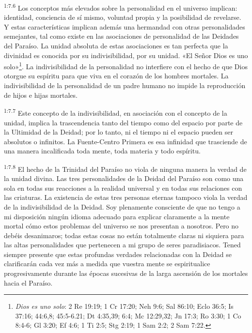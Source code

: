 \par
\textsuperscript{1:7.6} Los conceptos más elevados sobre la personalidad en el universo implican: identidad, conciencia de sí mismo, voluntad propia y la posibilidad de revelarse. Y estas características implican además una hermandad con otras personalidades semejantes, tal como existe en las asociaciones de personalidad de las Deidades del Paraíso. La unidad absoluta de estas asociaciones es tan perfecta que la divinidad es conocida por su indivisibilidad, por su unidad. «El Señor Dios es uno solo»\footnote{\textit{Dios es uno solo}: 2 Re 19:19; 1 Cr 17:20; Neh 9:6; Sal 86:10; Eclo 36:5; Is 37:16; 44:6,8; 45:5-6.21; Dt 4:35,39; 6:4; Mc 12:29,32; Jn 17:3; Ro 3:30; 1 Co 8:4-6; Gl 3:20; Ef 4:6; 1 Ti 2:5; Stg 2:19; 1 Sam 2:2; 2 Sam 7:22.}. La indivisibilidad de la personalidad no interfiere con el hecho de que Dios otorgue su espíritu para que viva en el corazón de los hombres mortales. La indivisibilidad de la personalidad de un padre humano no impide la reproducción de hijos e hijas mortales.

\par
\textsuperscript{1:7.7} Este concepto de la indivisibilidad, en asociación con el concepto de la unidad, implica la trascendencia tanto del tiempo como del espacio por parte de la Ultimidad de la Deidad; por lo tanto, ni el tiempo ni el espacio pueden ser absolutos o infinitos. La Fuente-Centro Primera es esa infinidad que trasciende de una manera incalificada toda mente, toda materia y todo espíritu.

\par
\textsuperscript{1:7.8} El hecho de la Trinidad del Paraíso no viola de ninguna manera la verdad de la unidad divina. Las tres personalidades de la Deidad del Paraíso son como una sola en todas sus reacciones a la realidad universal y en todas sus relaciones con las criaturas. La existencia de estas tres personas eternas tampoco viola la verdad de la indivisibilidad de la Deidad. Soy plenamente consciente de que no tengo a mi disposición ningún idioma adecuado para explicar claramente a la mente mortal cómo estos problemas del universo se nos presentan a nosotros. Pero no debéis desanimaros; todas estas cosas no están totalmente claras ni siquiera para las altas personalidades que pertenecen a mi grupo de seres paradisiacos. Tened siempre presente que estas profundas verdades relacionadas con la Deidad se clarificarán cada vez más a medida que vuestra mente se espiritualice progresivamente durante las épocas sucesivas de la larga ascensión de los mortales hacia el Paraíso.

